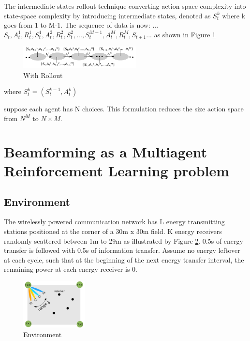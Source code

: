 The intermediate states rollout technique converting action space complexity into state-space complexity by introducing intermediate states, denoted as $S_t^k$ where k goes from 1 to M-1. The sequence of data is now: ...$S_t,A_t^1,R_t^1,S_t^1,A_t^2,R_t^2, S_t^2, ... , S_t^{M-1},A_t^M,R_t^M,S_{t+1}$... as shown in Figure \ref{fig:with}

\begin{figure}[H]
\centering
\includegraphics[width=0.55\textwidth]{with.png}
\caption{With Rollout}
\label{fig:with}
\end{figure}



where $S_t^k=(S_t^{k-1},A_t^k)$

suppose each agent has N choices. This formulation reduces the size action space from $N^M$ to $N \times M$.


\section{Beamforming as a Multiagent Reinforcement Learning problem}
\subsection{Environment}
The wirelessly powered communication network has L energy transmitting stations positioned at the corner of a 30m x 30m field. K energy receivers randomly scattered between 1m to 29m as illustrated by Figure \ref{fig:environment}. 0.5s of energy transfer is followed with 0.5s of information transfer. Assume no energy leftover at each cycle, such that at the beginning of the next energy transfer interval, the remaining power at each energy receiver is 0.


\begin{figure}[H]
\centering
\includegraphics[width=0.3\textwidth]{environment.png}
\caption{Environment}
\label{fig:environment}
\end{figure}


